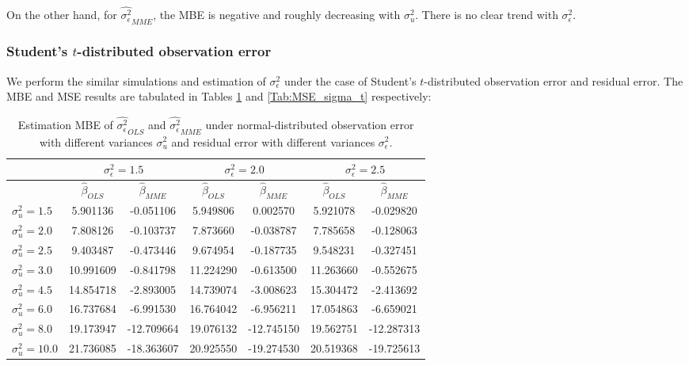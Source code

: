 \documentclass{article}
\begin{document}
On the other hand, for $\hat{\sigma^2_\epsilon}_{MME}$, the MBE is negative and roughly decreasing with $\sigma^2_u$. There is no clear trend with $\sigma^2_\epsilon$. 

\subsubsection{Student's $t$-distributed observation error}

We perform the similar simulations and estimation of $\sigma^2_\epsilon$ under the case of Student's $t$-distributed observation error and residual error.
The MBE and MSE results are tabulated in Tables \ref{Tab:MBE_sigma_t} and \ref{Tab:MSE_sigma_t} respectively:

\begin{table}[ht]
    \centering
    \caption{Estimation MBE of $\hat{\sigma^2_\epsilon}_{OLS}$ and $\hat{\sigma^2_\epsilon}_{MME}$ under normal-distributed observation error with different variances $\sigma^2_u$ and residual error with different variances $\sigma^2_\epsilon$.}
    \label{Tab:MBE_sigma_t}
    \begin{tabular}[t]{lcccccc}
        \hline
        &\multicolumn{2}{c}{$\sigma^2_\epsilon=1.5$}&\multicolumn{2}{c}{$\sigma^2_\epsilon=2.0$}&\multicolumn{2}{c}{$\sigma^2_\epsilon=2.5$}\\
        \hline
        &$\hat{\beta}_{OLS}$&$\hat{\beta}_{MME}$&$\hat{\beta}_{OLS}$&$\hat{\beta}_{MME}$&$\hat{\beta}_{OLS}$&$\hat{\beta}_{MME}$\\
        \hline
        $\sigma^2_u = 1.5$&5.901136&-0.051106&5.949806&0.002570&5.921078&-0.029820\\
        $\sigma^2_u = 2.0$&7.808126&-0.103737&7.873660&-0.038787&7.785658&-0.128063\\
        $\sigma^2_u = 2.5$&9.403487&-0.473446&9.674954&-0.187735&9.548231&-0.327451\\
        $\sigma^2_u = 3.0$&10.991609&-0.841798&11.224290&-0.613500&11.263660&-0.552675\\
        $\sigma^2_u = 4.5$&14.854718&-2.893005&14.739074&-3.008623&15.304472&-2.413692\\
        $\sigma^2_u = 6.0$&16.737684&-6.991530&16.764042&-6.956211&17.054863&-6.659021\\
        $\sigma^2_u = 8.0$&19.173947&-12.709664&19.076132&-12.745150&19.562751&-12.287313\\
        $\sigma^2_u = 10.0$&21.736085&-18.363607&20.925550&-19.274530&20.519368&-19.725613\\ 
    \end{tabular}
\end{table}
\end{document}
